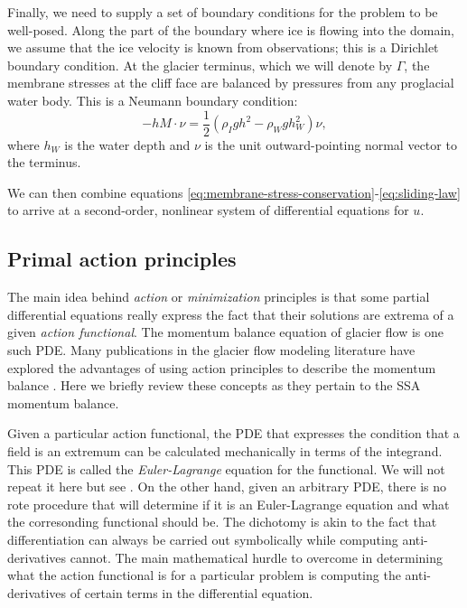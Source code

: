 \documentclass[twocolumn,letterpaper]{igs}
\begin{document}
Finally, we need to supply a set of boundary conditions for the problem to be well-posed.
Along the part of the boundary where ice is flowing into the domain, we assume that the ice velocity is known from observations; this is a Dirichlet boundary condition.
At the glacier terminus, which we will denote by $\Gamma$, the membrane stresses at the cliff face are balanced by pressures from any proglacial water body.
This is a Neumann boundary condition:
\begin{equation}
    -hM\cdot\nu = \frac{1}{2}\left(\rho_Igh^2 - \rho_Wgh_W^2\right)\nu,
    \label{eq:terminus-bc}
\end{equation}
where $h_W$ is the water depth and $\nu$ is the unit outward-pointing normal vector to the terminus.

We can then combine equations \eqref{eq:membrane-stress-conservation}-\eqref{eq:sliding-law} to arrive at a second-order, nonlinear system of differential equations for $u$.


\subsection{Primal action principles}
\label{sec:primal-action-principles}

The main idea behind \emph{action} or \emph{minimization} principles is that some partial differential equations really express the fact that their solutions are extrema of a given \emph{action functional}.
The momentum balance equation of glacier flow is one such PDE.
Many publications in the glacier flow modeling literature have explored the advantages of using action principles to describe the momentum balance \citep{bassis2010hamilton, dukowicz2010consistent, brinkerhoff2013data, shapero2021icepack}.
Here we briefly review these concepts as they pertain to the SSA momentum balance.

Given a particular action functional, the PDE that expresses the condition that a field is an extremum can be calculated mechanically in terms of the integrand.
This PDE is called the \emph{Euler-Lagrange} equation for the functional.
We will not repeat it here but see \citet{weinstock1974calculus}.
On the other hand, given an arbitrary PDE, there is no rote procedure that will determine if it is an Euler-Lagrange equation and what the corresonding functional should be.
The dichotomy is akin to the fact that differentiation can always be carried out symbolically while computing anti-derivatives cannot.
The main mathematical hurdle to overcome in determining what the action functional is for a particular problem is computing the anti-derivatives of certain terms in the differential equation.
\end{document}
